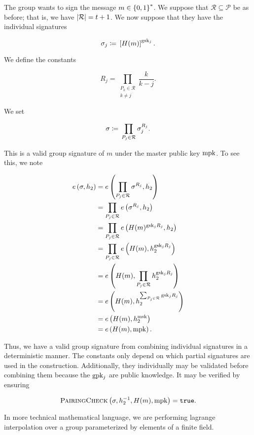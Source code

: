 The group wants to sign the message $m\in\left\{ 0,1 \right\}^{*}$.
We suppose that $\mathcal{R}\subseteq\mathcal{P}$ be as before;
that is, we have $\left| \mathcal{R} \right| = t+1$.
We now suppose that they have the individual signatures

\begin{equation}
    \sigma_{j} \coloneqq{} \left[ H(m) \right]^{\textrm{gsk}{}_{j}}.
\end{equation}

\noindent
We define the constants

\begin{equation}
    R_{j} = \prod_{\substack{P_{k}\in\mathcal{R} \\ k\ne j}}
        \frac{k}{k-j}.
\end{equation}

\noindent
We set

\begin{equation}
    \sigma \coloneqq{} \prod_{P_{j}\in\mathcal{R}} \sigma_{j}^{R_{j}}.
\end{equation}

This is a valid group signature of $m$ under the master public key $\textrm{mpk}{}$.
To see this, we note

\begin{align}
    e\left( \sigma, h_{2} \right)
        &= e\left( \prod_{P_{j}\in\mathcal{R}}\sigma^{R_{j}}, h_{2} \right)
            \nonumber\\
        &= \prod_{P_{j}\in\mathcal{R}} e\left( \sigma^{R_{j}}, h_{2} \right)
            \nonumber\\
        &= \prod_{P_{j}\in\mathcal{R}} e\left( H(m)^{\textrm{gsk}{}_{j}R_{j}}, h_{2} \right)
            \nonumber\\
        &= \prod_{P_{j}\in\mathcal{R}} e\left( H(m), h_{2}^{\textrm{gsk}{}_{j}R_{j}} \right)
            \nonumber\\
        &= e\left( H(m), \prod_{P_{j}\in\mathcal{R}} h_{2}^{\textrm{gsk}{}_{j}R_{j}} \right)
            \nonumber\\
        &= e\left( H(m), h_{2}^{\sum_{P_{j}\in\mathcal{R}} \textrm{gsk}{}_{j}R_{j}} \right)
            \nonumber\\
        &= e\left( H(m), h_{2}^{\textrm{msk}{}} \right)
            \nonumber\\
        &= e\left( H(m), \textrm{mpk}{} \right).
\end{align}

\noindent
Thus, we have a valid group signature from combining individual
signatures in a deterministic manner.
The constants only depend on which partial signatures are used
in the construction.
Additionally, they individually may be validated before combining them
because the $\textrm{gpk}{}_{j}$ are public knowledge.
It may be verified by ensuring

\begin{equation}
    \textsc{PairingCheck}{}\left( \sigma, h_{2}^{-1}, H(m), \textrm{mpk}{} \right) = \texttt{true}.
\end{equation}

In more technical mathematical language, we are performing
\gls{lagrange interpolation} over a group parameterized by elements
of a \gls{finite field}.
